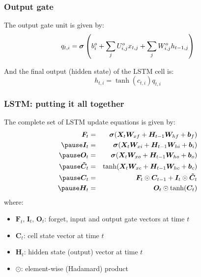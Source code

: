 \documentclass[smaller]{beamer}
\begin{document}
\begin{frame}
  \frametitle{Output gate}
  \pause

     The output gate unit is given by:
    \begin{equation}
      q_{t,i} = \bm\sigma\left(b_{i}^{o} + \sum_{j}U_{i,j}^{o}x_{t,j} + \sum_{j}W_{i,j}^{o}h_{t-1,j}\right)
    \end{equation}
    \pause

    And the final output (hidden state) of the LSTM cell is:
    \begin{equation}
      h_{t,i} = \tanh(c_{t,i})q_{t,i}
    \end{equation}
 \end{frame}


 \begin{frame}
  \frametitle{LSTM: putting it all together}\pe

  The complete set of LSTM update equations is given by:\pe
  \begin{eqnarray}
 \bm F_t &=& \bm \sigma(\bm X_t \bm W_{xf} + \bm H_{t-1}\bm W_{hf} + \bm b_f) \\\pe
 \bm I_t &=& \bm \sigma(\bm X_t \bm W_{xi} + \bm H_{t-1}\bm W_{hi} + \bm b_i) \\\pe
  \bm O_t &=& \bm \sigma(\bm X_t \bm W_{xo} + \bm H_{t-1}\bm W_{ho} + \bm b_o) \\\pe
  \bm{\tilde{C}}_t &=& \tanh(\bm X_t \bm W_{xc} + \bm H_{t-1}\bm W_{hc} + \bm b_c) \\\pe
  \bm C_t &=& \bm F_t \odot \bm C_{t-1} + \bm I_t \odot \bm{\tilde{C}}_t \\\pe
  \bm H_t &=& \bm O_t \odot \tanh(\bm C_t)
  \end{eqnarray}
  \pe
  where:
  \begin{itemize}
  \item $\bm F_t$, $\bm I_t$, $\bm O_t$: forget, input and output gate vectors at time $t$
  \item $\bm C_t$: cell state vector at time $t$
  \item $\bm H_t$: hidden state (output) vector at time $t$
  \item $\odot$: element-wise (Hadamard) product
  \end{itemize}      
 
 \end{frame}
\end{document}
